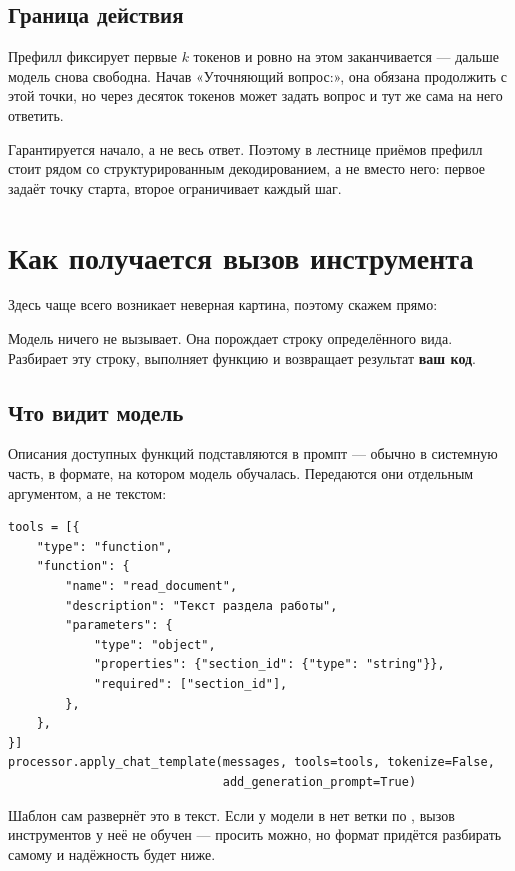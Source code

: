 \documentclass[11pt,a4paper]{article}
\begin{document}
\subsection{Граница действия}

Префилл фиксирует первые $k$ токенов и ровно на этом заканчивается —
дальше модель снова свободна. Начав «Уточняющий вопрос:», она обязана
продолжить с этой точки, но через десяток токенов может задать вопрос
и тут же сама на него ответить.

Гарантируется начало, а не весь ответ. Поэтому в лестнице приёмов
префилл стоит рядом со структурированным декодированием, а не вместо
него: первое задаёт точку старта, второе ограничивает каждый шаг.

\section{Как получается вызов инструмента}

Здесь чаще всего возникает неверная картина, поэтому скажем прямо:

\begin{keybox}
Модель ничего не вызывает. Она порождает строку определённого вида.
Разбирает эту строку, выполняет функцию и возвращает результат
\textbf{ваш код}.
\end{keybox}

\subsection{Что видит модель}

Описания доступных функций подставляются в промпт — обычно в системную
часть, в формате, на котором модель обучалась. Передаются они отдельным
аргументом, а не текстом:

\begin{Verbatim}
tools = [{
    "type": "function",
    "function": {
        "name": "read_document",
        "description": "Текст раздела работы",
        "parameters": {
            "type": "object",
            "properties": {"section_id": {"type": "string"}},
            "required": ["section_id"],
        },
    },
}]
processor.apply_chat_template(messages, tools=tools, tokenize=False,
                              add_generation_prompt=True)
\end{Verbatim}

Шаблон сам развернёт это в текст. Если у модели в 
нет ветки по , вызов инструментов у неё не обучен — просить
можно, но формат придётся разбирать самому и надёжность будет ниже.
\end{document}
